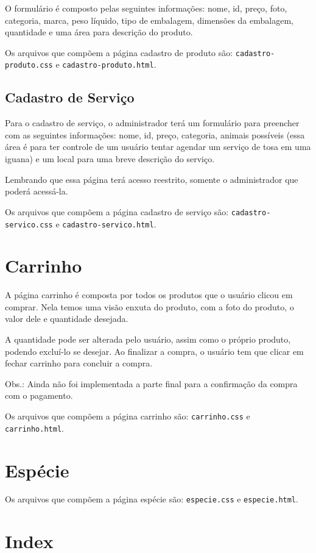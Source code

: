 O formulário é composto pelas seguintes informações: nome, id, preço, foto, categoria, marca,
peso líquido, tipo de embalagem, dimensões da embalagem, quantidade e uma área para descrição
do produto.

Os arquivos que compõem a página cadastro de produto são: \texttt{cadastro-produto.css} e
\texttt{cadastro-produto.html}.

\subsection{Cadastro de Serviço}
Para o cadastro de serviço, o administrador terá um formulário para preencher com as seguintes
informações: nome, id, preço, categoria, animais possíveis (essa área é para ter controle de um
usuário tentar agendar um serviço de tosa em uma iguana) e um local para uma breve descrição
do serviço.

Lembrando que essa página terá acesso reestrito, somente o administrador que poderá acessá-la.

Os arquivos que compõem a página cadastro de serviço são: \texttt{cadastro-servico.css} e
\texttt{cadastro-servico.html}.

\section{Carrinho}
A página carrinho é composta por todos os produtos que o usuário clicou em comprar. Nela temos
uma visão enxuta do produto, com a foto do produto, o valor dele e quantidade desejada.

A quantidade pode ser alterada pelo usuário, assim como o próprio produto, podendo excluí-lo se
desejar. Ao finalizar a compra, o usuário tem que clicar em fechar carrinho para concluir a compra.

Obs.: Ainda não foi implementada a parte final para a confirmação da compra com o pagamento.

Os arquivos que compõem a página carrinho são: \texttt{carrinho.css} e \texttt{carrinho.html}.

\section{Espécie}

Os arquivos que compõem a página espécie são: \texttt{especie.css} e \texttt{especie.html}.

\section{Index}


